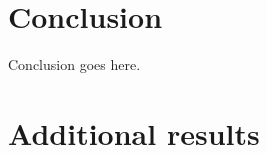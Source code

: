 \documentclass{article}
\begin{document}
\section{Conclusion}
Conclusion goes here. 

\clearpage


\clearpage

\appendix
\section{Additional results}
\setcounter{table}{0}
\renewcommand{\thetable}{\Alph{section}\arabic{table}}




\end{document}
